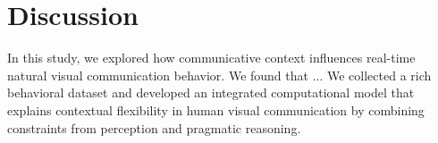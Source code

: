 \documentclass[9pt,twocolumn,twoside]{pnas-new}
\newcommand{\mwu}[1]{{\color{green}{[mwu: #1]}}}
\begin{document}


\section*{Discussion}

In this study, we explored how communicative context influences real-time natural visual communication behavior. We found that ... We collected a rich behavioral dataset and developed an integrated computational model that explains contextual flexibility in human visual communication by combining constraints from perception and pragmatic reasoning.
\end{document}
